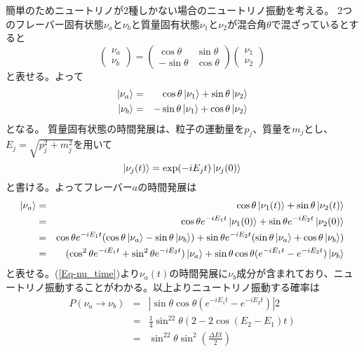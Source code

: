 \documentclass[a4paper,10pt]{jreport}
\begin{document}
簡単のためニュートリノが2種しかない場合のニュートリノ振動を考える。
2つのフレーバー固有状態$\nu_a$と$\nu_b$と質量固有状態$\nu_1$と$\nu_2$が混合角$\theta$で混ざっているとすると
\begin{equation} \label{Eq-NeutrinoOscillation2}
\left(
	\begin{array}{c}
		\nu_a \\
		\nu_b
	\end{array}
\right)
=
\left(
	\begin{array}{cc}
		\cos\theta & \sin\theta \\
		-\sin\theta & \cos\theta 
	\end{array}
\right)
\left(
	\begin{array}{c}
		\nu_1 \\
		\nu_2
	\end{array}
\right)
\end{equation}
と表せる。よって
\begin{eqnarray}
	\ket{\nu_a} &=& \cos\theta\ket{\nu_1}+\sin\theta\ket{\nu_2} \\
	\ket{\nu_b} &=& -\sin\theta\ket{\nu_1}+\cos\theta\ket{\nu_2}
\end{eqnarray}
となる。
質量固有状態の時間発展は、粒子の運動量を$p_j$、質量を$m_j$とし、$E_j=\sqrt{p_j^2+m_j^2}$を用いて
\begin{equation}
	\ket{\nu_j(t)}=\exp(-iE_jt)\ket{\nu_j(0)}
\end{equation}
と書ける。よってフレーバー$a$の時間発展は
\begin{eqnarray} \label{Eq-nu_time}
	\ket{\nu_a}
		&=& \cos\theta\ket{\nu_1(t)}+\sin\theta\ket{\nu_2(t)} \nonumber \\
		&=& \cos\theta e^{-iE_1t}\ket{\nu_1(0)}+\sin\theta e^{-iE_2t}\ket{\nu_2(0)} \nonumber \\
		&=& \cos\theta e^{-iE_1t}(\cos\theta\ket{\nu_a}-\sin\theta\ket{\nu_b})+\sin\theta e^{-iE_2t}(\sin\theta\ket{\nu_a}+		\cos\theta\ket{\nu_b}) \nonumber \\
		&=& (\cos^2\theta e^{-iE_1t}+\sin^2\theta e^{-iE_2t})\ket{\nu_a}+\sin\theta\cos\theta(e^{-iE_1t}-e^{-iE_2t})\ket{\nu_b}
\end{eqnarray}
と表せる。(\ref{Eq-nu_time})より$\nu_a(t)$の時間発展に$\nu_b$成分が含まれており、ニュートリノ振動することがわかる。以上よりニュートリノ振動する確率は
\begin{eqnarray} \label{Eq-P_NeutrinoOscillation}
	P(\nu_a\to\nu_b) &=& |\sin\theta\cos\theta(e^{-iE_1t}-e^{-iE_2t})|2 \nonumber \\
	&=& \frac{1}{4}\sin^22\theta(2-2\cos(E_2-E_1)t) \nonumber \\
	&=& \sin^22\theta\sin^2\left(\frac{\Delta Et}{2}\right)
\end{eqnarray}
\end{document}
